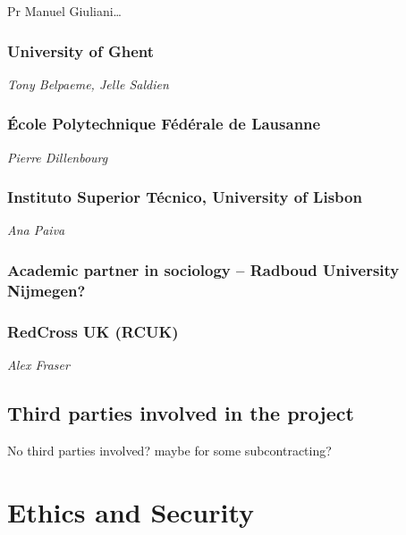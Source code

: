 \documentclass[]{article}
\begin{document}
Pr Manuel Giuliani\ldots{}

\hypertarget{university-of-ghent}{%
\subsubsection{University of Ghent}\label{university-of-ghent}}

\emph{Tony Belpaeme, Jelle Saldien}

\hypertarget{uxe9cole-polytechnique-fuxe9duxe9rale-de-lausanne}{%
\subsubsection{École Polytechnique Fédérale de
Lausanne}\label{uxe9cole-polytechnique-fuxe9duxe9rale-de-lausanne}}

\emph{Pierre Dillenbourg}

\hypertarget{instituto-superior-tuxe9cnico-university-of-lisbon}{%
\subsubsection{Instituto Superior Técnico, University of
Lisbon}\label{instituto-superior-tuxe9cnico-university-of-lisbon}}

\emph{Ana Paiva}

\hypertarget{academic-partner-in-sociology-radboud-university-nijmegen}{%
\subsubsection{Academic partner in sociology -- Radboud University
Nijmegen?}\label{academic-partner-in-sociology-radboud-university-nijmegen}}

\hypertarget{redcross-uk-rcuk}{%
\subsubsection{RedCross UK (RCUK)}\label{redcross-uk-rcuk}}

\emph{Alex Fraser}

\hypertarget{third-parties-involved-in-the-project}{%
\subsection{Third parties involved in the
project}\label{third-parties-involved-in-the-project}}

No third parties involved? maybe for some subcontracting?

\hypertarget{ethics-and-security}{%
\section{Ethics and Security}\label{ethics-and-security}}
\end{document}
